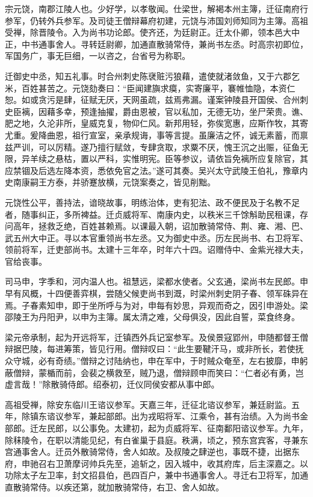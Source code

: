 \documentclass[]{article}
\begin{document}
宗元饶，南郡江陵人也。少好学，以孝敬闻。仕梁世，解褐本州主簿，迁征南府行参军，仍转外兵参军。及司徒王僧辩幕府初建，元饶与沛国刘师知同为主簿。高祖受禅，除晋陵令。入为尚书功论郎。使齐还，为廷尉正。迁太仆卿，领本邑大中正，中书通事舍人。寻转廷尉卿，加通直散骑常侍，兼尚书左丞。时高宗初即位，军国务广，事无巨细，一以咨之，台省号为称职。

迁御史中丞，知五礼事。时合州刺史陈裦赃污狼藉，遣使就渚敛鱼，又于六郡乞米，百姓甚苦之。元饶劾奏曰：``臣闻建旟求瘼，实寄廉平，褰帷恤隐，本资仁恕。如或贪污是肆，征赋无厌，天网虽疏，兹焉弗漏。谨案钟陵县开国侯、合州刺史臣褵，因藉多幸，预逢抽擢，爵由恩被，官以私加，无德无功，坐尸荣贵。谯、肥之地，久沦非所，皇威克复，物仰仁风。新邦用轻，弥俟宽惠，应斯作牧，其寄尤重。爰降曲恩，祖行宣室，亲承规诲，事等言提。虽廉洁之怀，诚无素蓄，而禀兹严训，可以厉精。遂乃擅行赋敛，专肆贪取，求粟不厌，愧王沉之出赈，征鱼无限，异羊续之悬枯，置以严科，实惟明宪。臣等参议，请依旨免褵所应复除官，其应禁锢及后选左降本资，悉依免官之法。''遂可其奏。吴兴太守武陵王伯礼，豫章内史南康嗣王方泰，并骄蹇放横，元饶案奏之，皆见削黜。

元饶性公平，善持法，谙晓故事，明练治体，吏有犯法、政不便民及于名教不足者，随事纠正，多所裨益。迁贞威将军、南康内史，以秩米三千馀斛助民租课，存问高年，拯救乏绝，百姓甚赖焉。以课最入朝，诏加散骑常侍、荆、雍、湘、巴、武五州大中正。寻以本官重领尚书左丞。又为御史中丞。历左民尚书、右卫将军、领前将军，迁吏部尚书。太建十三年卒，时年六十四。诏赠侍中、金紫光禄大夫，官给丧事。

司马申，字季和，河内温人也。祖慧远，梁都水使者。父玄通，梁尚书左民郎。申早有风概，十四便善弈棋，尝随父候吏尚书到溉，时梁州刺史阴子春、领军硃异在焉。子春素知申，即于坐所呼与为对，申每有妙思，异观而奇之，因引申游处。梁邵陵王为丹阳尹，以申为主簿。属太清之难，父母俱没，因此自誓，菜食终身。

梁元帝承制，起为开远将军，迁镇西外兵记室参军。及侯景寇郢州，申随都督王僧辩据巴陵，每进筹策，皆见行用。僧辩叹曰：``此生要鞬汗马，或非所长，若使抚众守城，必有奇绩。''僧辩之讨陆纳也，申在军中，于时贼众奄至，左右披靡，申躬蔽僧辩，蒙楯而前，会裴之横救至，贼乃退，僧辩顾申而笑曰：``仁者必有勇，岂虚言哉！''除散骑侍郎。绍泰初，迁仪同侯安都从事中郎。

高祖受禅，除安东临川王谘议参军。天嘉三年，迁征北谘议参军，兼廷尉监。五年，除镇东谘议参军，兼起部郎。出为戎昭将军、江乘令，甚有治绩。入为尚书金部郎。迁左民郎，以公事免。太建初，起为贞威将军、征南鄱阳谘议参军。九年，除秣陵令，在职以清能见纪，有白雀巢于县庭。秩满，顷之，预东宫宾客，寻兼东宫通事舍人。迁员外散骑常侍，舍人如故。及叔陵之肆逆也，事既不捷，出据东府，申驰召右卫萧摩诃帅兵先至，追斩之，因入城中，收其府库，后主深嘉之。以功除太子左卫率，封文招县伯，邑四百户，兼中书通事舍人。寻迁右卫将军，加通直散骑常侍。以疾还第，就加散骑常侍，右卫、舍人如故。
\end{document}
